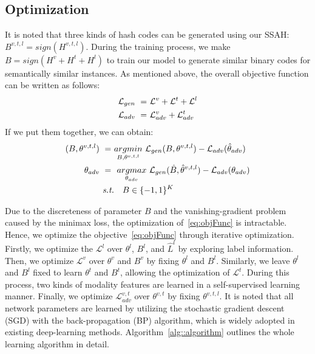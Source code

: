 \documentclass[10pt,twocolumn,letterpaper]{article}
\begin{document}
\subsection{Optimization}
\vspace{-0.15cm}
It is noted that three kinds of hash codes can be generated using our SSAH: $B^{v,t,l} = sign(H^{v,t,l})$. During the training process, we make $B=sign(H^{v}+H^{t}+H^{l})$ to train our model to generate similar binary codes for semantically similar instances. As mentioned above, the overall objective function can be written as follows:
\vspace{-0.2cm}
\begin{equation}
\label{eq:objFuncDivide}
\begin{aligned}
\mathcal{L}_{gen} \ =& \ \mathcal{L}^{v} +\mathcal{L}^{t} + \mathcal{L}^{l} \\
\mathcal{L}_{adv} \ =& \  \mathcal{L}_{adv}^{v} + \mathcal{L}_{adv}^{t} \\
\end{aligned}
\vspace{-0.2cm}
\end{equation}
\vspace{-0.2cm}
If we put them together, we can obtain:
\vspace{-0.05cm}
\begin{equation}
\label{eq:objFunc}
\begin{aligned}
( B, \theta^{v,t,l}) \ = \ & \underset {B, \theta^{v,t,l}}{ arg min } \ \mathcal{L}_{gen}(B, \theta^{v,t,l})-\mathcal{L}_{adv}(\hat{\theta}_{adv}) \\
\theta_{adv} \ = \ & \underset { \theta_{adv} } { \ arg max \ }\mathcal{L}_{gen}(\hat{B}, \hat{\theta}^{v,t,l})- \mathcal{L}_{adv}(\theta_{adv}) \\
\emph{s.t.}& \quad  B \in \{-1, 1\}^K
\end{aligned}
\vspace{-0.1cm}
\end{equation}

Due to the discreteness of parameter $B$ and the vanishing-gradient problem caused by the minimax loss, the optimization of~\eqref{eq:objFunc} is intractable. Hence, we optimize the objective~\eqref{eq:objFunc} through iterative optimization. Firstly, we optimize the $\mathcal{L}^{l}$ over $\theta^{l}$, $B^{l}$, and $\hat{L}^{l}$ by exploring label information. Then, we optimize $\mathcal{L}^{v}$ over $\theta^{v}$ and $B^{v}$ by fixing $\theta^{l}$ and $B^{l}$. Similarly, we leave $\theta^{l}$ and $B^{l}$ fixed to learn $\theta^{t}$ and $B^{t}$, allowing the optimization of $\mathcal{L}^{t}$. During this process, two kinds of modality features are learned in a self-supervised learning manner. Finally, we optimize $\mathcal{L}_{adv}^{v,t}$ over $\theta^{v,t}$ by fixing $\theta^{v,t,l}$. It is noted that all network parameters are learned by utilizing the stochastic gradient descent (SGD) with the back-propagation (BP) algorithm, which is widely adopted in existing deep-learning methods. Algorithm~\ref{alg::algorithm} outlines the whole learning algorithm in detail.
\end{document}
